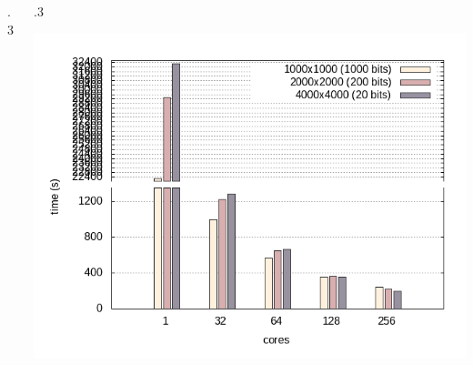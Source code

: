 \documentclass{beamer}
\begin{document}
\begin{frame}
\begin{description}
\begin{columns}
\begin{column} {.3\textwidth}
\begin{center}
        \end{center}
      \end{column}
      \begin{column} {.3\textwidth}
        \begin{center}
          \includegraphics[width=.9\textwidth]{nodes_histogram}
        \end{center}
      \end{column}
    \end{columns}
\end{description}
\end{frame}
\end{document}
